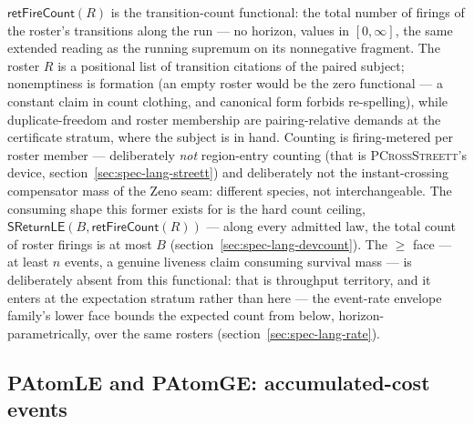 $\mathsf{retFireCount}(R)$ is the transition-count functional: the
total number of firings of the roster's transitions along the run
--- no horizon, values in $[0, \infty]$, the same extended reading
as the running supremum on its nonnegative fragment. The roster $R$
is a positional list of transition citations of the paired subject;
nonemptiness is formation (an empty roster would be the zero
functional --- a constant claim in count clothing, and canonical
form forbids re-spelling), while duplicate-freedom and roster
membership are pairing-relative demands at the certificate stratum,
where the subject is in hand. Counting is firing-metered per roster
member --- deliberately \emph{not} region-entry counting (that is
\textsc{PCrossStreett}'s device,
section~\ref{sec:spec-lang-streett}) and deliberately not the
instant-crossing compensator mass of the Zeno seam: different
species, not interchangeable. The consuming shape this former
exists for is the hard count ceiling,
$\mathsf{SReturnLE}(B, \mathsf{retFireCount}(R))$ --- along every
admitted law, the total count of roster firings is at most $B$
(section~\ref{sec:spec-lang-devcount}). The $\ge$ face --- at least
$n$ events, a genuine liveness claim consuming survival mass --- is
deliberately absent from this functional: that is throughput
territory, and it enters at the expectation stratum rather than
here --- the event-rate envelope family's lower face bounds the
expected count from below, horizon-parametrically, over the same
rosters (section~\ref{sec:spec-lang-rate}).



\subsection{PAtomLE and PAtomGE: accumulated-cost events}
\label{sec:spec-lang-patom}



